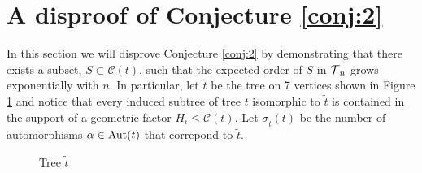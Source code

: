  
\section{A disproof of Conjecture \ref{conj:2}}\label{sec:disproof}
In this section we will disprove Conjecture \ref{conj:2} by demonstrating that there exists a subset, $S\subset\mathcal{C}(t)$, such 
that the expected order of $S$ in $\operatorname{\mathcal{T}}_n$ grows exponentially with $n$.  In particular, let 
$\tilde{t}$ be the tree on 7 vertices shown in Figure \ref{fig:7} and notice that every induced subtree of tree $t$ isomorphic to 
$\tilde{t}$ is contained in the support of a geometric factor $H_i \leq \mathcal{C}(t)$. %
Let $\sigma_{\tilde{t}}(t)$  be the number of automorphisms $\alpha \in \operatorname{Aut}(t)$ that correpond to $\tilde{t}$.  
\begin{figure}[H]
\centering
{}
\caption{Tree $\tilde{t}$}\label{fig:7}
\end{figure} 

